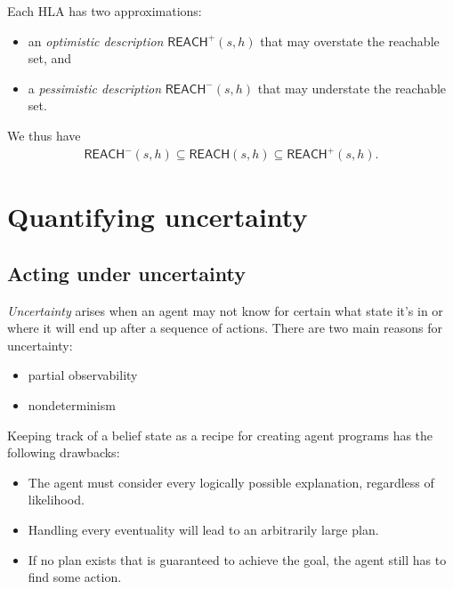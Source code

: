 \documentclass{article}
\begin{document}
\begin{definition}
    Each HLA has two approximations:
    \begin{itemize}
        \item an \emph{optimistic description} $\textsf{REACH}^+(s,h)$ that may
              overstate the reachable set, and
        \item a \emph{pessimistic description} $\textsf{REACH}^-(s,h)$ that may
              understate the reachable set.
    \end{itemize}
    We thus have
    \begin{align*}
        \textsf{REACH}^-(s,h) \subseteq\textsf{REACH}(s,h)\subseteq\textsf{REACH}^+(s,h).
    \end{align*}
\end{definition}


\section{Quantifying uncertainty}


\subsection{Acting under uncertainty}

\begin{definition}[R\&N p. 480]
    \emph{Uncertainty} arises when an agent may not know for certain what state
    it's in or where it will end up after a sequence of actions. There are
    two main reasons for uncertainty:
    \begin{itemize}
        \item partial observability
        \item nondeterminism
    \end{itemize}
\end{definition}

\begin{lemma}
    Keeping track of a belief state as a recipe for creating agent programs
    has the following drawbacks:
    \begin{itemize}
        \item The agent must consider every logically possible explanation, regardless of likelihood.
        \item Handling every eventuality will lead to an arbitrarily large plan.
        \item If no plan exists that is guaranteed to achieve the goal, the agent still has to find some action.
    \end{itemize}
\end{lemma}
\end{document}

